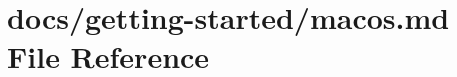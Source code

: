 \hypertarget{macos_8md}{}\section{docs/getting-\/started/macos.md File Reference}
\label{macos_8md}

